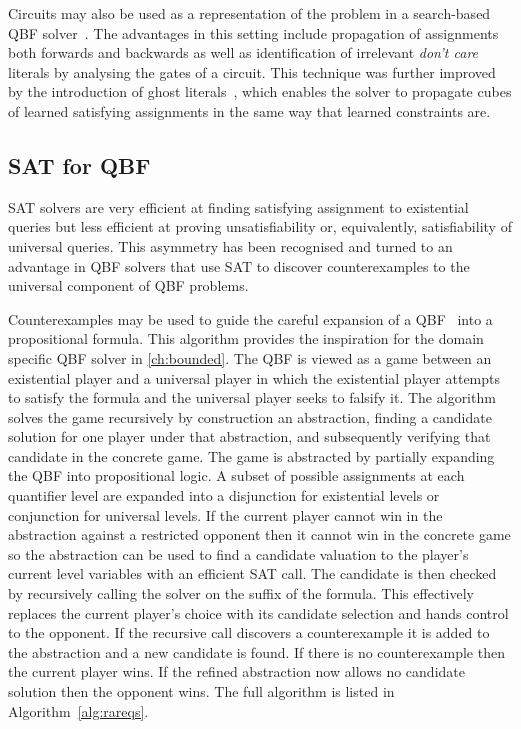 Circuits may also be used as a representation of the problem in a search-based QBF solver~\cite{Goultiaeva09}. The advantages in this setting include propagation of assignments both forwards and backwards as well as identification of irrelevant \emph{don't care} literals by analysing the gates of a circuit. This technique was further improved by the introduction of ghost literals~\cite{Klieber10}, which enables the solver to propagate cubes of learned satisfying assignments in the same way that learned constraints are.

\subsection{SAT for QBF}

SAT solvers are very efficient at finding satisfying assignment to existential queries but less efficient at proving unsatisfiability or, equivalently, satisfiability of universal queries. This asymmetry has been recognised and turned to an advantage in QBF solvers that use SAT to discover counterexamples to the universal component of QBF problems.

Counterexamples may be used to guide the careful expansion of a QBF~\cite{Janota15} into a propositional formula. This algorithm provides the inspiration for the domain specific QBF solver in \ref{ch:bounded}. The QBF is viewed as a game between an existential player and a universal player in which the existential player attempts to satisfy the formula and the universal player seeks to falsify it. The algorithm solves the game recursively by construction an abstraction, finding a candidate solution for one player under that abstraction, and subsequently verifying that candidate in the concrete game. The game is abstracted by partially expanding the QBF into propositional logic. A subset of possible assignments at each quantifier level are expanded into a disjunction for existential levels or conjunction for universal levels. If the current player cannot win in the abstraction against a restricted opponent then it cannot win in the concrete game so the abstraction can be used to find a candidate valuation to the player's current level variables with an efficient SAT call. The candidate is then checked by recursively calling the solver on the suffix of the formula. This effectively replaces the current player's choice with its candidate selection and hands control to the opponent. If the recursive call discovers a counterexample it is added to the abstraction and a new candidate is found. If there is no counterexample then the current player wins. If the refined abstraction now allows no candidate solution then the opponent wins. The full algorithm is listed in Algorithm~\ref{alg:rareqs}.


